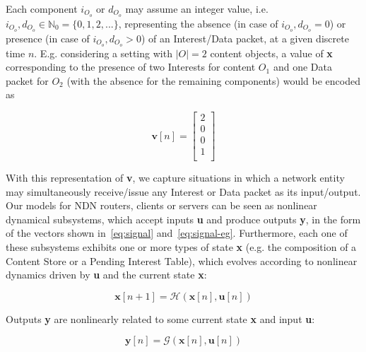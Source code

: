 Each component $i_{O_o}$ or $d_{O_o}$ may assume an integer value, i.e. $i_{O_o}, d_{O_o} \in \mathbb{N}_0 = \{0, 1, 2, ... \}$, 
representing the absence (in case of $i_{O_o}, d_{O_o} = 0$) or presence (in case of $i_{O_o}, d_{O_o} > 0$) of an 
Interest\slash Data packet, at a given discrete time $n$. E.g. considering a setting 
with $|O| = 2$ content objects, a value of \textbf{x} corresponding to the presence 
of two Interests for content $O_1$ and one Data packet for $O_2$ (with the absence 
for the remaining components) would be encoded as

\begin{equation}
    \textbf{v}[n] = \begin{bmatrix}     2   \\ 
                                        0   \\ 
                                        0   \\ 
                                        1   \\ \end{bmatrix}
    \label{eq:signal-eg}
\end{equation}\shortvertbreak

With this 
representation of \textbf{v}, we capture situations in which a network 
entity may simultaneously receive\slash issue any Interest or Data packet as 
its input\slash output. Our models for NDN routers, clients or servers can be 
seen as nonlinear dynamical subsystems, which accept inputs \textbf{u} and produce 
outputs \textbf{y}, in the form of the vectors shown in~\ref{eq:signal} 
and~\ref{eq:signal-eg}. Furthermore, each one of these subsystems exhibits one or 
more types of state \textbf{x} (e.g. the composition of a Content Store or a Pending 
Interest Table), which evolves according to nonlinear dynamics driven by \textbf{u} and 
the current state \textbf{x}:

\begin{equation}
    \textbf{x}[n + 1] = \mathcal{H}(\textbf{x}[n],\textbf{u}[n])
    \label{eq:state}
\end{equation}%

Outputs \textbf{y} are nonlinearly related to some current state \textbf{x} and input \textbf{u}:

\begin{equation}
    \textbf{y}[n] = \mathcal{G}(\textbf{x}[n],\textbf{u}[n])
    \label{eq:outputs}
\end{equation}%

